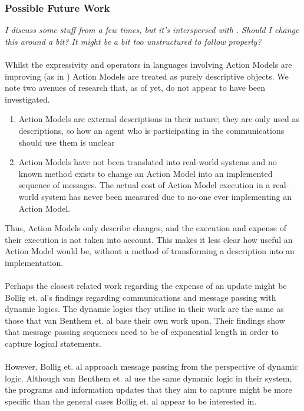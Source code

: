\documentclass[12pt, a4paper, twoside]{article}
\begin{document}
\subsubsection{Possible Future Work}
{\em I discuss some stuff from \citep{benthem2006lcc} a few times, but it's
	interspersed with \citep{bollig07mps}.
Should I change this around a bit?
It might be a bit too unstructured to follow properly?}\\
\\
Whilst the expressivity and operators in languages involving Action Models are
improving (as in \citep{benthem2006lcc}) Action Models are treated as purely
descriptive objects.
We note two avenues of research that, as of yet, do not appear to have been
investigated.
\begin{enumerate}
	\item Action Models are external descriptions in their nature; they are only used as
	descriptions, so how an agent who is participating in the communications
	should use them is unclear
	\item Action Models have not been translated into real-world systems and no
	known method exists to change an Action Model into an implemented sequence of
	messages. The actual cost of Action Model execution in a real-world system has
	never been measured due to no-one ever implementing an Action Model.
\end{enumerate}
Thus, Action Models only describe changes, and the execution and expense of
their execution is not taken into account.
This makes it less clear how useful an Action Model would be, without a method
of transforming a description into an implementation.\\
\\
Perhaps the closest related work regarding the expense of an update might be
Bollig et. al's findings regarding communications and message passing with
dynamic logics.
The dynamic logics they utilise in their work are the same as those that van
Benthem et. al base their own work upon.
Their findings show that message passing sequences need to be of exponential
length in order to capture logical statements. \citep{bollig07mps}\\
\\
However, Bollig et. al approach message passing from the perspective of dynamic
logic.
Although van Benthem et. al use the same dynamic logic in their system, the
programs and information updates that they aim to capture might be more specific
than the general cases Bollig et. al appear to be interested in.
\end{document}
